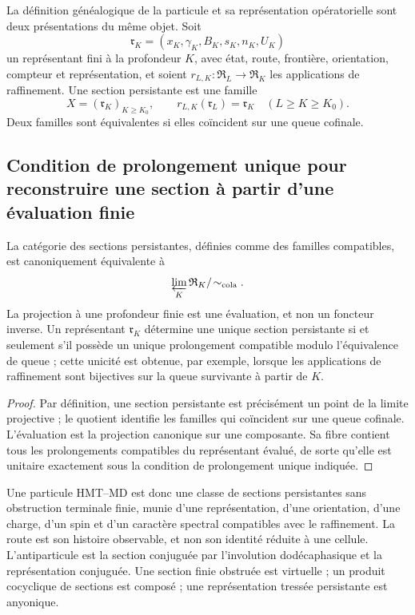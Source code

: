 La définition généalogique de la particule et sa représentation opératorielle sont
deux présentations du même objet. Soit
\[
 \mathfrak r_K=(x_K,\gamma_K,B_K,s_K,n_K,U_K)
\]
un représentant fini à la profondeur \(K\), avec état, route, frontière,
orientation, compteur et représentation, et soient
\(r_{L,K}:\mathfrak R_L\to\mathfrak R_K\) les applications de raffinement. Une
section persistante est une famille
\[
 X=(\mathfrak r_K)_{K\ge K_0},
 \qquad r_{L,K}(\mathfrak r_L)=\mathfrak r_K
 \quad(L\ge K\ge K_0).
\]
Deux familles sont équivalentes si elles coïncident sur une queue cofinale.

\subsection{Condition de prolongement unique pour reconstruire une section à partir d'une évaluation finie}

\begin{theorem}
La catégorie des sections persistantes, définies comme des familles compatibles,
est canoniquement équivalente à
\[
 \varprojlim_K\mathfrak R_K/\!\sim_{\rm cola}.
\]
La projection à une profondeur finie est une évaluation, et non un foncteur inverse.
Un représentant \(\mathfrak r_K\) détermine une unique section persistante si
et seulement s'il possède un unique prolongement compatible modulo l'équivalence de queue ;
cette unicité est obtenue, par exemple, lorsque les applications de raffinement sont
bijectives sur la queue survivante à partir de \(K\).
\end{theorem}

\begin{proof}
Par définition, une section persistante est précisément un point de la limite
projective ; le quotient identifie les familles qui coïncident sur une queue cofinale.
L'évaluation est la projection canonique sur une composante. Sa fibre contient
tous les prolongements compatibles du représentant évalué, de sorte qu'elle
est unitaire exactement sous la condition de prolongement unique indiquée.
\end{proof}

Une particule HMT--MD est donc une classe de sections persistantes sans
obstruction terminale finie, munie d'une représentation, d'une orientation, d'une charge,
d'un spin et d'un caractère spectral compatibles avec le raffinement. La route est son
histoire observable, et non son identité réduite à une cellule. L'antiparticule
est la section conjuguée par l'involution dodécaphasique et la représentation
conjuguée. Une section finie obstruée est virtuelle ; un produit cocyclique de
sections est composé ; une représentation tressée persistante est anyonique.

